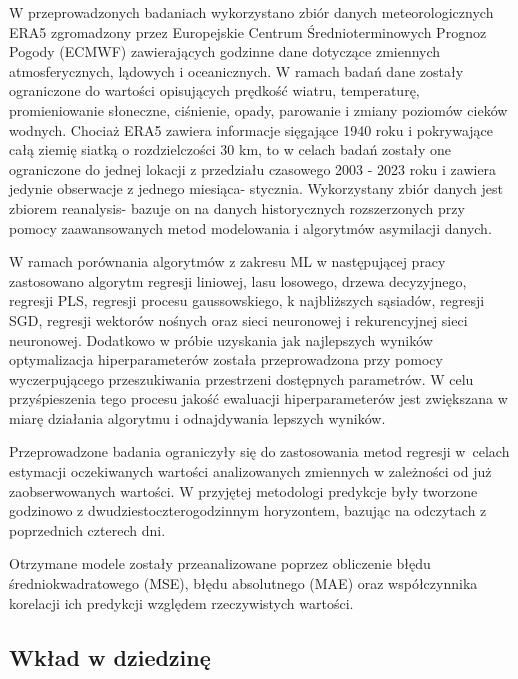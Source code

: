 W przeprowadzonych badaniach wykorzystano zbiór danych meteorologicznych ERA5
zgromadzony przez Europejskie Centrum Średnioterminowych Prognoz Pogody (ECMWF)
zawierających godzinne dane dotyczące zmiennych atmosferycznych, lądowych i
oceanicznych. W ramach badań dane zostały ograniczone do wartości opisujących
prędkość wiatru, temperaturę, promieniowanie słoneczne, ciśnienie, opady, parowanie i
zmiany poziomów cieków wodnych. Chociaż ERA5 zawiera informacje sięgające 1940
roku i pokrywające całą ziemię siatką o rozdzielczości 30 km, 
to w celach badań zostały one ograniczone do jednej lokacji z przedziału czasowego 
2003 - 2023 roku i zawiera jedynie obserwacje z jednego miesiąca- stycznia. 
Wykorzystany zbiór danych jest zbiorem reanalysis- bazuje on na 
danych historycznych rozszerzonych przy pomocy zaawansowanych metod modelowania i 
algorytmów asymilacji danych.

W ramach porównania algorytmów z zakresu ML w następującej pracy zastosowano
algorytm regresji liniowej, lasu losowego, drzewa decyzyjnego, regresji PLS, 
regresji procesu gaussowskiego, k najbliższych sąsiadów, regresji SGD, 
regresji wektorów nośnych oraz sieci neuronowej i rekurencyjnej sieci neuronowej. 
Dodatkowo w próbie uzyskania jak najlepszych wyników optymalizacja hiperparameterów
została przeprowadzona przy pomocy wyczerpującego przeszukiwania przestrzeni 
dostępnych parametrów. W celu przyśpieszenia tego procesu jakość ewaluacji 
hiperparameterów jest zwiększana w miarę działania algorytmu i odnajdywania lepszych
wyników.

Przeprowadzone badania ograniczyły się do zastosowania metod regresji w~celach
estymacji oczekiwanych wartości analizowanych zmiennych w zależności
od już zaobserwowanych wartości. W przyjętej metodologi predykcje były tworzone
godzinowo z dwudziestoczterogodzinnym horyzontem, bazując na odczytach z poprzednich
czterech dni.

Otrzymane modele zostały przeanalizowane poprzez obliczenie błędu 
średniokwadratowego (MSE), błędu absolutnego (MAE) oraz współczynnika korelacji
ich predykcji względem rzeczywistych wartości.

\subsection{Wkład w dziedzinę}

